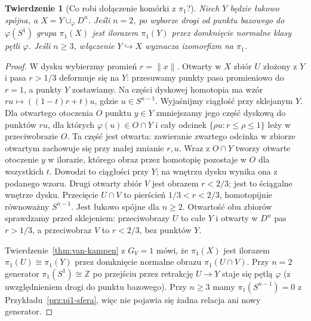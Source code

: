 \documentclass[11pt,a4paper,oneside]{report}
\newcommand{\Z}{\mathbb{Z}}
\theoremstyle{plain}
\newtheorem{twierdzenie}{Twierdzenie}[section]
\theoremstyle{definition}
\theoremstyle{remark}
\begin{document}
\begin{twierdzenie}[Co robi dołączenie komórki z $\pi_1$?]
\label{thm:pi1-dolaczenie-komorki}
Niech $Y$ będzie łukowo spójna,
a $X=Y\cup_\varphi D^n$.
Jeśli $n=2$, po wyborze drogi od
punktu bazowego do $\varphi(S^1)$
grupa $\pi_1(X)$ jest ilorazem
$\pi_1(Y)$ przez domknięcie normalne
klasy pętli $\varphi$.
Jeśli $n\geq3$, włączenie
$Y\hookrightarrow X$ wyznacza
izomorfizm na $\pi_1$.
\end{twierdzenie}
\begin{proof}
W dysku wybierzmy promień $r=\|x\|$.
Otwarty w $X$ zbiór $U$ złożony
z $Y$ i pasa $r>1/3$ deformuje
się na $Y$: przesuwamy punkty
pasa promieniowo do $r=1$,
a punkty $Y$ zostawiamy. Na części dyskowej homotopia ma wzór
$ru\mapsto((1-t)r+t)u$, gdzie $u\in S^{n-1}$.
Wyjaśnijmy ciągłość przy sklejanym $Y$. Dla otwartego otoczenia
$O$ punktu $y\in Y$ zmniejszamy jego część dyskową do punktów $ru$,
dla których $\varphi(u)\in O\cap Y$ i cały odcinek
$\{\rho u:r\leq\rho\leq1\}$ leży w przeciwobrazie $O$.
Ta część jest otwarta: zawieranie zwartego odcinka w zbiorze
otwartym zachowuje się przy małej zmianie $r,u$.
Wraz z $O\cap Y$ tworzy otwarte otoczenie $y$ w ilorazie,
którego obraz przez homotopię pozostaje w $O$ dla wszystkich $t$.
Dowodzi to ciągłości przy $Y$; na wnętrzu dysku wynika ona z podanego wzoru.
Drugi otwarty zbiór $V$ jest
obrazem $r<2/3$; jest to
ściągalne wnętrze dysku.
Przecięcie $U\cap V$ to pierścień
$1/3<r<2/3$, homotopijnie
równoważny $S^{n-1}$.
Jest łukowo spójne dla $n\geq2$.
Otwartość obu zbiorów sprawdzamy przed sklejeniem:
przeciwobrazy $U$ to całe $Y$ i otwarty w $D^n$ pas $r>1/3$,
a przeciwobraz $V$ to $r<2/3$, bez punktów $Y$.

Twierdzenie~\ref{thm:van-kampen}
z $G_V=1$ mówi, że $\pi_1(X)$
jest ilorazem $\pi_1(U)\cong\pi_1(Y)$
przez domknięcie normalne obrazu
$\pi_1(U\cap V)$. Przy $n=2$
generator $\pi_1(S^1)\cong\Z$
po przejściu przez retrakcję
$U\to Y$ staje się pętlą
$\varphi$ (z uwzględnieniem
drogi do punktu bazowego).
Przy $n\geq3$ mamy
$\pi_1(S^{n-1})=0$ z
Przykładu~\ref{prz:pi1-sfera},
więc nie pojawia się żadna
relacja ani nowy generator.
\end{proof}
\end{document}
